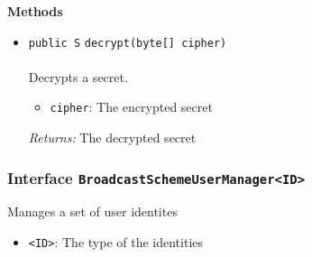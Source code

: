 \textbf{\sffamily Methods}
\begin{itemize}
\item \lstinline|public S| \lstinline|decrypt|\lstinline|(byte[] cipher)|\\ \\[-0.6em]
Decrypts a secret.
\begin{itemize}
\item \lstinline|cipher|: The encrypted secret
\end{itemize}

\emph{Returns:} The decrypted secret

\end{itemize}

\subsubsection{Interface \lstinline|BroadcastSchemeUserManager<ID>|}
Manages a set of user identites \\
\noindent\begin{minipage}[t]{5cm}
\vspace{0.3em}
\hspace*{2em}
\vspace{0.3em}
\end{minipage}

\begin{itemize}
\item \lstinline|<ID>|: The type of the identities
\end{itemize}




